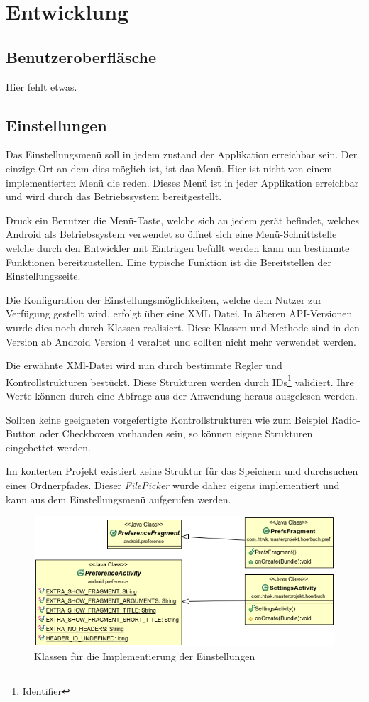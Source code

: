 \section{Entwicklung}
\subsection{Benutzeroberfläsche}
Hier fehlt etwas.
\subsection{Einstellungen}
Das Einstellungsmenü soll in jedem zustand der Applikation erreichbar sein. Der einzige Ort an dem dies möglich ist, ist das Menü. Hier ist nicht von einem implementierten Menü die reden. Dieses Menü ist in jeder Applikation erreichbar und wird durch das Betriebssystem bereitgestellt.

Druck ein Benutzer die Menü-Taste, welche sich an jedem gerät befindet, welches Android als Betriebssystem verwendet so öffnet sich eine Menü-Schnittstelle welche durch den Entwickler mit Einträgen befüllt werden kann um bestimmte Funktionen bereitzustellen. Eine typische Funktion ist die Bereitstellen der Einstellungsseite.

Die Konfiguration der Einstellungsmöglichkeiten, welche dem Nutzer zur Verfügung gestellt wird, erfolgt über eine XML Datei. In älteren API-Versionen wurde dies noch durch Klassen realisiert. Diese Klassen und Methode sind in den Version ab Android Version 4 veraltet und sollten nicht mehr verwendet werden.

Die erwähnte XMl-Datei wird nun durch bestimmte Regler und Kontrollstrukturen bestückt. Diese Strukturen werden durch IDs\footnote{Identifier} validiert. Ihre Werte können durch eine Abfrage aus der Anwendung heraus ausgelesen werden.

Sollten keine geeigneten vorgefertigte Kontrollstrukturen wie zum Beispiel Radio-Button oder Checkboxen vorhanden sein, so können eigene Strukturen eingebettet werden.

Im konterten Projekt existiert keine Struktur für das Speichern und durchsuchen eines Ordnerpfades. Dieser \textit{FilePicker} wurde daher eigens implementiert und kann aus dem Einstellungsmenü aufgerufen werden.

\begin{center}
\begin{figure}
\includegraphics[scale=0.7]{images/settings}
\caption{Klassen für die Implementierung der Einstellungen}
\label{settings}
\end{figure}
\end{center}

